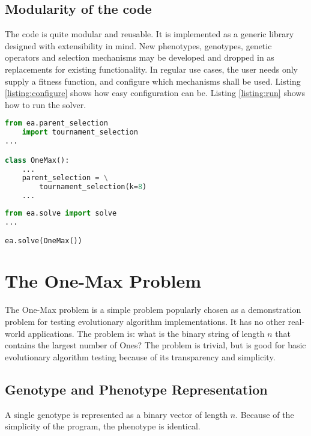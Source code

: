 \documentclass[twocolumn,oneside]{amsart}
\begin{document}
\subsection{Modularity of the code}
The code is quite modular and reusable.
It is implemented as a generic library designed with extensibility in mind.
New phenotypes, genotypes, genetic operators and selection mechanisms may be developed and dropped in as replacements for existing functionality.
In regular use cases, the user needs only supply a fitness function, and configure which mechanisms shall be used.
Listing \ref{listing:configure} shows how easy configuration can be.
Listing \ref{listing:run} shows how to run the solver.

\begin{lstlisting}[frame=single,language=Python,caption={The One-Max problem being configured to be solved with tournament selection.},label={listing:configure}]
from ea.parent_selection
    import tournament_selection
...

class OneMax():
    ...
    parent_selection = \
        tournament_selection(k=8)
    ...
\end{lstlisting}

\begin{lstlisting}[frame=single,language=Python,caption={The solver solving the One-Max problem.},label={listing:run}]
from ea.solve import solve
...

ea.solve(OneMax())

\end{lstlisting}
\label{listing:run}

\section{The One-Max Problem}

The One-Max problem is a simple problem popularly chosen as a demonstration problem for testing evolutionary algorithm implementations.
It has no other real-world applications.
The problem is: what is the binary string of length $ n $ that contains the largest number of Ones?
The problem is trivial, but is good for basic evolutionary algorithm testing because of its transparency and simplicity.

\subsection{Genotype and Phenotype Representation}

A single genotype is represented as a binary vector of length $ n $.
Because of the simplicity of the program, the phenotype is identical.
\end{document}
